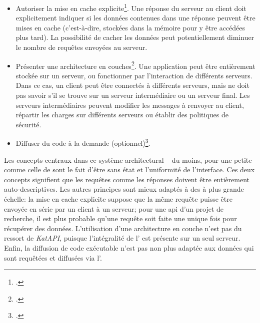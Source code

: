 \begin{itemize}
\begin{itemize}
	\end{itemize}
	\item Autoriser la mise en cache explicite\footcite[p. 79-81]{fielding_architectural_2000}. Une réponse du serveur au client doit explicitement indiquer si les données contenues dans une réponse peuvent être mises en cache (c'est-à-dire, stockées dans la mémoire pour y être accédées plus tard). La possibilité de cacher les données peut potentiellement diminuer le nombre de requêtes envoyées au serveur.
	\item Présenter une architecture en couches\footcite[p. 82-84]{fielding_architectural_2000}. Une application peut être entièrement stockée sur un serveur, ou fonctionner par l'interaction de différents serveurs. Dans ce cas, un client peut être connectés à différents serveurs, mais ne doit pas savoir s'il se trouve sur un serveur intermédiaire ou un serveur final. Les serveurs intermédiaires peuvent modifier les messages à renvoyer au client, répartir les charges sur différents serveurs ou établir des politiques de sécurité.
	\item Diffuser du code à la demande (optionnel)\footcite[p. 84-85]{fielding_architectural_2000}.
\end{itemize}

Les concepts centraux dans ce système architectural -- du moins, pour une petite \api{} comme celle de \ktb{} sont le fait d'être sans état et l'uniformité de l'interface. Ces deux concepts signifient que les requêtes comme les réponses doivent être entièrement auto-descriptives. Les autres principes sont mieux adaptés à des \api{} à plus grande échelle: la mise en cache explicite suppose que la même requête puisse être envoyée en série par un client à un serveur; pour une \gls{api} d'un projet de recherche, il est plus probable qu'une requête soit faite une unique fois pour récupérer des données. L'utilisation d'une architecture en couche n'est pas du ressort de \textit{KatAPI}, puisque l'intégralité de l'\api{} est présente sur un seul serveur. Enfin, la diffusion de code exécutable n'est pas non plus adaptée aux données qui sont requêtées et diffusées via l'\api{}.

